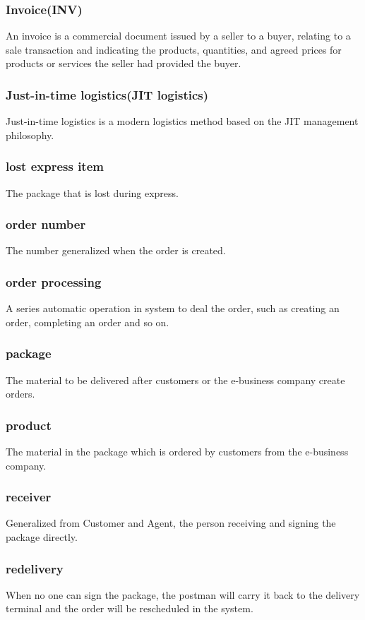 \documentclass[12pt]{scrreprt}
\begin{document}
\begin{spacing}{0.7}
\subsubsection{Invoice(INV)}
An invoice is a commercial document issued by a seller to a buyer,
relating to a sale transaction and indicating the products, quantities,
and agreed prices for products or services the seller had provided the buyer.
\subsubsection{Just-in-time logistics(JIT logistics)}
Just-in-time logistics is a modern logistics method based on the JIT
management philosophy.
\subsubsection{lost express item}
The package that is lost during express.
\subsubsection{order number}
The number generalized when the order is created.
\subsubsection{order processing}
A series automatic operation in system to deal the order, such as
creating an order, completing an order and so on.
\subsubsection{package}
The material to be delivered after customers or the e-business company
create orders.
\subsubsection{product}
The material in the package which is ordered by customers from the
e-business company.
\subsubsection{receiver}
Generalized from Customer and Agent, the person receiving and signing
the package directly.
\subsubsection{redelivery}
When no one can sign the package, the postman will carry it back to
the delivery terminal and the order will be rescheduled in the system.

\end{spacing}
\end{document}
